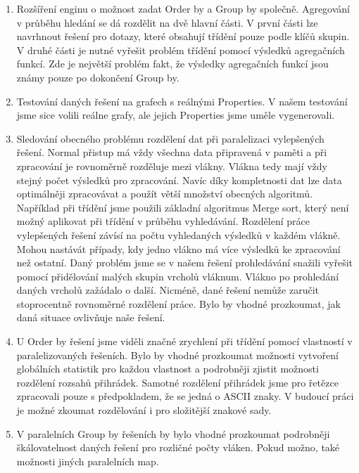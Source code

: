 \begin{enumerate}

\item Rozšíření enginu o možnost zadat Order by a Group by společně.
Agregování v průběhu hledání se dá rozdělit na dvě hlavní části.
V první části lze navrhnout řešení pro dotazy, které obsahují třídění pouze podle klíčů skupin.
V druhé části je nutné vyřešit problém třídění pomocí výsledků agregačních funkcí.
Zde je největší problém fakt, že výsledky agregačních funkcí jsou známy pouze po dokončení Group by.

\item Testování daných řešení na grafech s reálnými Properties.
V našem testování jsme sice volili reálne grafy, ale jejich Properties jsme uměle vygenerovali.

\item Sledování obecného problému rozdělení dat při paralelizaci vylepšených řešení. 
Normal přistup má vždy všechna data připravená v paměti a při zpracování je rovnoměrně rozděluje mezi vlákny.
Vlákna tedy mají vždy stejný počet výsledků pro zpracování.
Navíc díky kompletnosti dat lze data optimálněji zpracovávat a použít větší množství obecných algoritmů.
Například při třídění jsme použili základní algoritmus Merge sort, který není možný aplikovat při třídění v průběhu vyhledávání.  
Rozdělení práce vylepšených řešení závísí na počtu vyhledaných výsledků v každém vlákně.
Mohou nastávát případy, kdy jedno vlákno má více výsledků ke zpracování než ostatní. 
Daný problém jsme se v našem řešení prohledávání snažili vyřešit pomocí přidělování malých skupin vrcholů vláknum.
Vlákno po prohledání daných vrcholů zažádalo o další.
Nicméně, dané řešení nemůže zaručit stoprocentně rovnoměrné rozdělení práce.
Bylo by vhodné prozkoumat, jak daná situace ovlivňuje naše řešení.

\item U Order by řešení jsme viděli značné zrychlení při třídění pomocí vlastností v paralelizovaných řešeních.
Bylo by vhodné prozkoumat možnosti vytvoření globálních statistik pro každou vlastnost a podrobněji zjistit možnosti rozdělení rozsahů přihrádek.
Samotné rozdělení přihrádek jsme pro řetězce zpracovali pouze s předpokladem, že se jedná o ASCII znaky.
V budoucí práci je možné zkoumat rozdělování i pro složitější znakové sady.

\item V paralelních Group by řešeních by bylo vhodné prozkoumat podrobněji škálovatelnost daných řešení pro rozličné počty vláken.
Pokud možno, také možnosti jiných paralelních map.
 
\end{enumerate}